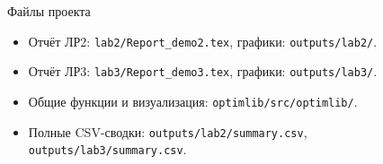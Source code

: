 ﻿\documentclass[10pt,aspectratio=169]{beamer}
\begin{document}
\begin{frame}{Файлы проекта}
\begin{itemize}
    \item Отчёт ЛР2: \texttt{lab2/Report\_demo2.tex}, графики: \texttt{outputs/lab2/}.
    \item Отчёт ЛР3: \texttt{lab3/Report\_demo3.tex}, графики: \texttt{outputs/lab3/}.
    \item Общие функции и визуализация: \texttt{optimlib/src/optimlib/}.
    \item Полные CSV-сводки: \texttt{outputs/lab2/summary.csv}, \texttt{outputs/lab3/summary.csv}.
\end{itemize}

\end{frame}
\end{document}
